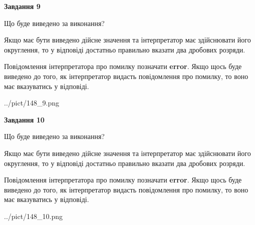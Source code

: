 \documentclass[12pt, ukrainian]{article}
\begin{document}
{\begin {Large}
{\begin {center}\textbf{Завдання 9}\end {center}}\par
Що буде виведено за виконання? \par

Якщо має бути виведено дійсне значення та інтерпретатор має здійснювати його округлення, 
то у відповіді достатньо правильно вказати два дробових розряди.

Повідомлення інтерпретатора про помилку позначати \textbf{error}.
Якщо щось буде виведено до того, як інтерпретатор видасть повідомлення про помилку, 
то воно має вказуватись у відповіді. \par

\begin{center}
	{../pict/148_9.png}
\end{center}
\newpage

{\begin {center}\textbf{Завдання 10}\end {center}}\par
Що буде виведено за виконання? \par

Якщо має бути виведено дійсне значення та інтерпретатор має здійснювати його округлення, 
то у відповіді достатньо правильно вказати два дробових розряди.

Повідомлення інтерпретатора про помилку позначати \textbf{error}.
Якщо щось буде виведено до того, як інтерпретатор видасть повідомлення про помилку, 
то воно має вказуватись у відповіді. \par

\begin{center}
	{../pict/148_10.png}
\end{center}
\newpage

\end {Large}}
\end{document}
